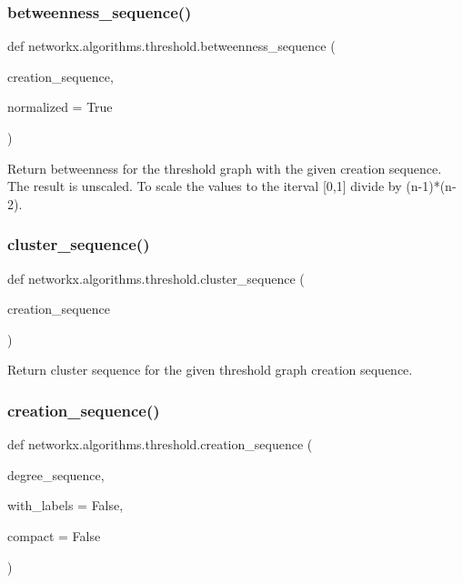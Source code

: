 \subsubsection{\texorpdfstring{betweenness\+\_\+sequence()}{betweenness\_sequence()}}
{\footnotesize\ttfamily def networkx.\+algorithms.\+threshold.\+betweenness\+\_\+sequence (\begin{DoxyParamCaption}\item[{}]{creation\+\_\+sequence,  }\item[{}]{normalized = {\ttfamily True} }\end{DoxyParamCaption})}

\begin{DoxyVerb}Return betweenness for the threshold graph with the given creation
sequence.  The result is unscaled.  To scale the values
to the iterval [0,1] divide by (n-1)*(n-2).
\end{DoxyVerb}
 \mbox{\label{namespacenetworkx_1_1algorithms_1_1threshold_aeef7458fd02d22f9c71a16cdb2159456}} 
\subsubsection{\texorpdfstring{cluster\+\_\+sequence()}{cluster\_sequence()}}
{\footnotesize\ttfamily def networkx.\+algorithms.\+threshold.\+cluster\+\_\+sequence (\begin{DoxyParamCaption}\item[{}]{creation\+\_\+sequence }\end{DoxyParamCaption})}

\begin{DoxyVerb}Return cluster sequence for the given threshold graph creation sequence.
\end{DoxyVerb}
 \mbox{\label{namespacenetworkx_1_1algorithms_1_1threshold_a0b9028c3c0a3a2fda4bf3b836189d3dc}} 
\subsubsection{\texorpdfstring{creation\+\_\+sequence()}{creation\_sequence()}}
{\footnotesize\ttfamily def networkx.\+algorithms.\+threshold.\+creation\+\_\+sequence (\begin{DoxyParamCaption}\item[{}]{degree\+\_\+sequence,  }\item[{}]{with\+\_\+labels = {\ttfamily False},  }\item[{}]{compact = {\ttfamily False} }\end{DoxyParamCaption})}

